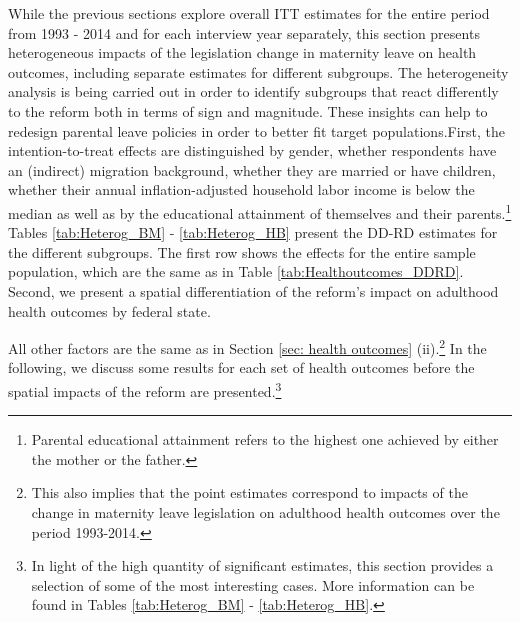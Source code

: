 \documentclass[a4paper ]{article}
\begin{document}
While the previous sections explore overall ITT estimates for the entire period from 1993 - 2014 and for each interview year separately, this section presents heterogeneous impacts of the legislation change in maternity leave on health outcomes, including separate estimates for different subgroups. The heterogeneity analysis is being carried out in order to identify subgroups that react differently to the reform both in terms of sign and magnitude. These insights can help to redesign parental leave policies in order to better fit target populations.\newline First, the intention-to-treat effects are distinguished by gender, whether respondents have an (indirect) migration background, whether they are married or have children, whether their annual inflation-adjusted household labor income is below the median as well as by the educational attainment of themselves and their parents.\footnote{Parental educational attainment refers to the highest one achieved by either the mother or the father.} Tables \ref{tab:Heterog_BM} - \ref{tab:Heterog_HB} present the DD-RD estimates for the different subgroups. The first row shows the effects for the entire sample population, which are the same as in Table \ref{tab:Healthoutcomes_DDRD}. \newline
Second, we present a spatial differentiation of the reform's impact on adulthood health outcomes by federal state.

All other factors are the same as in Section \ref{sec: health outcomes} (ii).\footnote{This also implies that the point estimates correspond to impacts of the change in maternity leave legislation on adulthood health outcomes over the period 1993-2014. } In the following, we discuss some results for each set of health outcomes before the spatial impacts of the reform are presented.\footnote{In light of the high quantity of significant estimates, this section provides a selection of some of the most interesting cases. More information can be found in Tables \ref{tab:Heterog_BM} - \ref{tab:Heterog_HB}.} \newline
\end{document}
